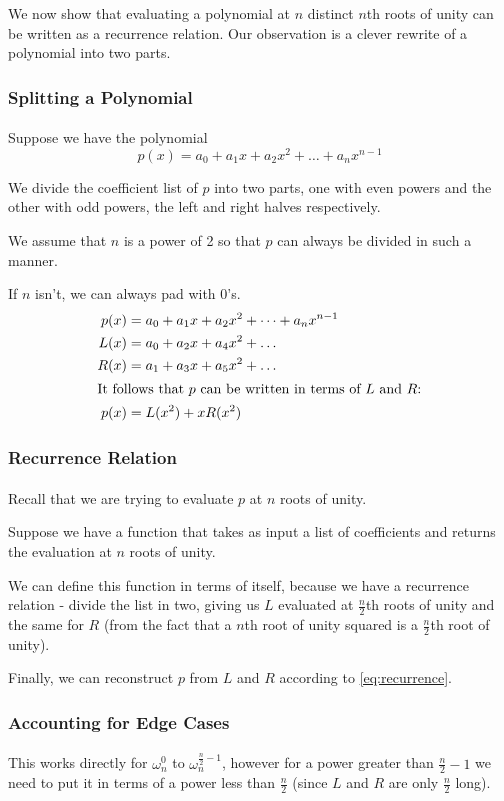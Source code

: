 \documentclass{beamer}                             %
\begin{document}
\begin{frame}
\frametitle{}
\framesubtitle{}
We now show that evaluating a polynomial at \( n \) distinct \( n \)th roots of
unity can be written as a recurrence relation.
Our observation is a clever rewrite of a polynomial into two parts.
\end{frame}

\begin{frame}
\frametitle{Splitting a Polynomial}
\framesubtitle{}
Suppose we have the polynomial
\[ p(x) = a_0 + a_1 x + a_2 x^2 + \dots + a_n x^{n - 1} \]

We divide the coefficient list of \( p \) into two parts,
one with even powers and the other with odd powers,
the left and right halves respectively. \pause

We assume that \( n \) is a power of 2 so that \( p \)
can always be divided in such a manner. 

If \( n \) isn't, we can always pad with 0's. \pause
\begin{align}
  p(x) &= a_0 + a_1 x + a_2 x^2 + \dots + a_n x^{n - 1} \\
  L(x) &= a_0 + a_2 x + a_4 x^2 + \dots \\
  R(x) &= a_1 + a_3 x + a_5 x^2 + \dots \\
  \shortintertext{It follows that \( p \) can be written
  in terms of \( L \) and \( R \):}
  p(x) &= L(x^2) + x R(x^2) \label{eq:recurrence} 
\end{align}
\end{frame}

\begin{frame}
\frametitle{Recurrence Relation}
\framesubtitle{}
Recall that we are trying to evaluate \( p \) at \( n \) roots of unity. \pause

Suppose we have a function that takes as input a list of coefficients
and returns the evaluation at \( n \) roots of unity. \pause

We can define this function in terms of itself, because we have a recurrence
relation - divide the list in two, giving us \( L \) evaluated at 
\( \frac{n}{2} \)th roots of unity and the same for \( R \)
(from the fact that a \( n \)th root of unity squared
is a \( \frac{n}{2} \)th root of unity). \pause

Finally, we can reconstruct \( p \) from \( L \) and \( R \)
according to \eqref{eq:recurrence}.
\end{frame}

\begin{frame}
\frametitle{Accounting for Edge Cases}
\framesubtitle{}
This works directly for \( \omega^0_n \)
to \( \omega^{\frac{n}{2} - 1}_n \), however for a power greater than
\( \frac{n}{2} - 1 \) we need to put it in terms of a power less than
\( \frac{n}{2} \) (since \( L \) and \( R \) are only \( \frac{n}{2} \) long).
\end{frame}
\end{document}
